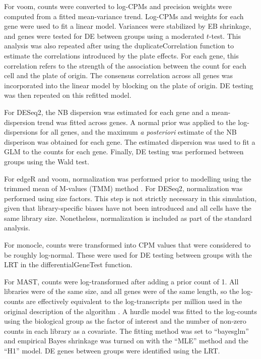 \documentclass{article}
\begin{document}
For voom, counts were converted to log-CPMs and precision weights were computed from a fitted mean-variance trend.
Log-CPMs and weights for each gene were used to fit a linear model.
Variances were stabilized by EB shrinkage, and genes were tested for DE between groups using a moderated $t$-test.
This analysis was also repeated after using the duplicateCorrelation function to estimate the correlations introduced by the plate effects.
For each gene, this correlation refers to the strength of the association between the count for each cell and the plate of origin.
The consensus correlation across all genes was incorporated into the linear model by blocking on the plate of origin.
DE testing was then repeated on this refitted model.

For DESeq2, the NB dispersion was estimated for each gene and a mean-dispersion trend was fitted across genes.
A normal prior was applied to the log-dispersions for all genes, and the maximum \textit{a posteriori} estimate of the NB disperison was obtained for each gene.
The estimated dispersion was used to fit a GLM to the counts for each gene.
Finally, DE testing was performed between groups using the Wald test.

For edgeR and voom, normalization was performed prior to modelling using the trimmed mean of M-values (TMM) method \cite{robinson2010scaling}.
For DESeq2, normalization was performed using size factors.
This step is not strictly necessary in this simulation, given that library-specific biases have not been introduced and all cells have the same library size.
Nonetheless, normalization is included as part of the standard analysis.

For monocle, counts were transformed into CPM values that were considered to be roughly log-normal.
These were used for DE testing between groups with the LRT in the differentialGeneTest function.

For MAST, counts were log-transformed after adding a prior count of 1.
All libraries were of the same size, and all genes were of the same length, 
    so the log-counts are effectively equivalent to the log-transcripts per million used in the original description of the algorithm \cite{finak2015mast}.
A hurdle model was fitted to the log-counts using the biological group as the factor of interest and the number of non-zero counts in each library as a covariate.
The fitting method was set to ``bayesglm'' and empirical Bayes shrinkage was turned on with the ``MLE'' method and the ``H1'' model.
DE genes between groups were identified using the LRT.
\end{document}
